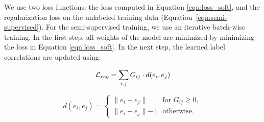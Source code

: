 \documentclass[11pt,a4paper]{article}
\begin{document}
We use two loss functions: the loss computed in Equation \ref{eqn:loss_soft}, and the regularization loss on the unlabeled training data (Equation~\ref{eqn:semi-supervised}).
For the semi-supervised training, we use an iterative batch-wise training. In the first step, all weights of the model are minimized by minimizing the loss in Equation \ref{eqn:loss_soft}. In the next step, the learned label correlations are updated using:

\begin{equation}
      \mathcal{L}_{reg} = \sum_{i, j} G_{ij} \cdot d(e_i, e_j)\\
      \label{eqn:semi-supervised}
\end{equation}

\begin{equation*}
d(e_i, e_j)=
      \begin{cases}
      \rVert e_i - e_j \lVert & \text{for } G_{ij} \geq 0,\\
      \rVert e_i - e_j \lVert - 1 & \text{otherwise.}
      \end{cases}
      \label{eqn:distance}
\end{equation*}
\end{document}
